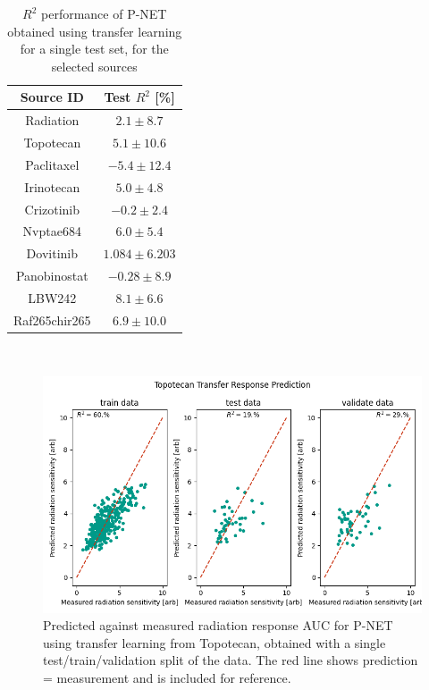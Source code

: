 \documentclass[NOTE, disdraft=true, UKenglish]{\DISCDTLATEXPATH UCLCDTDISdoc}
\begin{document}
\begin{table}[]
    \centering
 \caption{$R^2$ performance of P-NET obtained using transfer learning for a single test set, for the selected sources}
    \begin{tabular}{c|c}
    Source ID    & Test $R^2$ [\%] \\ \hline
     Radiation & $2.1 \pm 8.7$ \\
     Topotecan &  $5.1 \pm 10.6$ \\
     Paclitaxel &  $-5.4 \pm 12.4$ \\
     Irinotecan &  $5.0 \pm 4.8$ \\
     Crizotinib &  $-0.2 \pm 2.4$ \\
     Nvptae684 &  $6.0 \pm 5.4$ \\
     Dovitinib &  $1.084 \pm 6.203$ \\
     Panobinostat &  $-0.28 \pm 8.9$ \\
     LBW242 &  $8.1 \pm 6.6$ \\
     Raf265chir265 &  $6.9 \pm 10.0$ \\
    \end{tabular}
    \label{tab:transfer_perf}
\end{table}
\\

\begin{figure}
    \centering
    \includegraphics[width=1\textwidth]{Figures/Topotecan_tranfer.png}
    \caption{Predicted against measured radiation response AUC for P-NET using transfer learning from Topotecan, obtained with a single test/train/validation split of the data. The red line shows prediction = measurement and is included for reference.}
    \label{Topotecan_transfer}
\end{figure}
\end{document}
